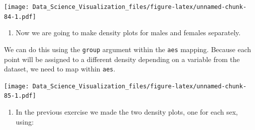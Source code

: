 \documentclass[
]{article}
\newenvironment{Shaded}{\begin{snugshade}}{\end{snugshade}}
\newcommand{\CommentTok}[1]{\textcolor[rgb]{0.56,0.35,0.01}{\textit{#1}}}
\newcommand{\DataTypeTok}[1]{\textcolor[rgb]{0.13,0.29,0.53}{#1}}
\newcommand{\KeywordTok}[1]{\textcolor[rgb]{0.13,0.29,0.53}{\textbf{#1}}}
\newcommand{\NormalTok}[1]{#1}
\newcommand{\OperatorTok}[1]{\textcolor[rgb]{0.81,0.36,0.00}{\textbf{#1}}}
\newcommand{\StringTok}[1]{\textcolor[rgb]{0.31,0.60,0.02}{#1}}
\providecommand{\tightlist}{%
  \setlength{\itemsep}{0pt}\setlength{\parskip}{0pt}}
\begin{document}
\begin{Shaded}
\end{Shaded}

\texttt{[image: Data\_Science\_Visualization\_files/figure-latex/unnamed-chunk-84-1.pdf]}

\begin{enumerate}
\def\labelenumi{\arabic{enumi}.}
\setcounter{enumi}{19}
\tightlist
\item
  Now we are going to make density plots for males and females
  separately.
\end{enumerate}

We can do this using the \texttt{group} argument within the \texttt{aes}
mapping. Because each point will be assigned to a different density
depending on a variable from the dataset, we need to map within
\texttt{aes}.

\begin{Shaded}
\end{Shaded}

\texttt{[image: Data\_Science\_Visualization\_files/figure-latex/unnamed-chunk-85-1.pdf]}

\begin{enumerate}
\def\labelenumi{\arabic{enumi}.}
\setcounter{enumi}{20}
\tightlist
\item
  In the previous exercise we made the two density plots, one for each
  sex, using:
\end{enumerate}

\begin{Shaded}
\end{Shaded}
\end{document}
